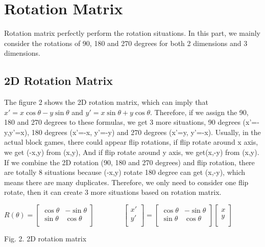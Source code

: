\section{Rotation Matrix}
Rotation matrix perfectly perform the rotation situations. In this part, we mainly consider the rotations of 90, 180 and 270 degrees for both 2 dimensions and 3 dimensions.
\subsection{2D Rotation Matrix}
The figure 2 shows the 2D rotation matrix, which can imply that $x'=x\cos\theta-y\sin\theta$ and $y'=x\sin\theta+y\cos\theta$. Therefore, if we assign the 90, 180 and 270 degrees to these formulas, we get 3 more situations, 90 degrees (x'=-y,y'=x), 180 degrees (x'=-x, y'=-y) and 270 degrees (x'=y, y'=-x). Usually, in the actual block games, there could appear flip rotations, if flip rotate around x axis, we get  (-x,y) from (x,y), And if flip rotate around y axis, we get(x,-y) from (x,y). If we combine the 2D rotation (90, 180 and 270 degrees) and flip rotation, there are totally 8 situations because (-x,y) rotate 180 degree can get (x,-y), which means there are many duplicates. Therefore, we only need to consider one flip rotate, then it can create 3 more situations based on rotation matrix. 
\begin{center}
$
R(\theta)=\begin{bmatrix}
\cos\theta & -\sin\theta\\
\sin\theta & \cos\theta\\
\end{bmatrix}
$
$\hspace{40pt}$
$
\begin{bmatrix}
x'\\
y'\\
\end{bmatrix}
=\begin{bmatrix}
\cos\theta & -\sin\theta\\
\sin\theta & \cos\theta\\
\end{bmatrix}
\begin{bmatrix}
x\\
y\\
\end{bmatrix}
$
\end{center}
\begin{center}
Fig. 2. 2D rotation matrix
\end{center}
